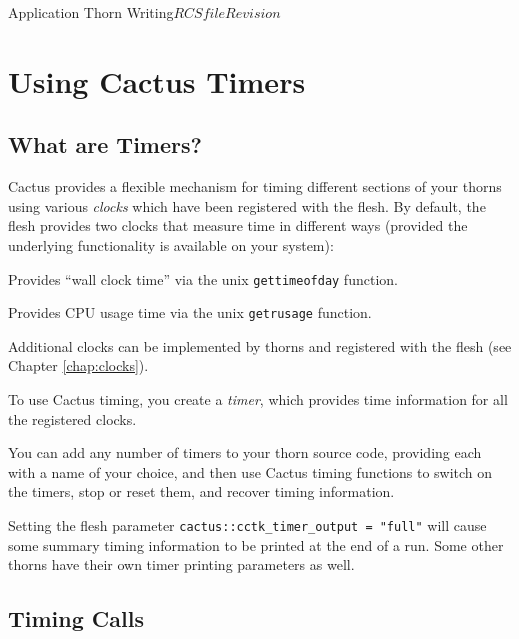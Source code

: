 \begin{cactuspart}{Application Thorn Writing}{$RCSfile$}{$Revision$}

\section{Using Cactus Timers}
\label{sec:timers}

\subsection{What are Timers?}

Cactus provides a flexible mechanism for timing different sections of your
thorns using various \textit{clocks} which have been registered with the flesh. 
By default, the flesh provides two clocks that measure time in different
ways (provided the underlying functionality is available on your system):

\begin{Lentry}

\item[\texttt{GetTimeOfDay}]
        Provides ``wall clock time'' via the unix \texttt{gettimeofday} function.
\item[\texttt{GetrUsage}]
        Provides CPU usage time via the unix \texttt{getrusage} function.
\end{Lentry}

Additional clocks can be implemented by thorns and registered with the
flesh (see Chapter \ref{chap:clocks}).

To use Cactus timing, you create a \textit{timer}, which provides time
information for all the registered clocks.

You can add any number of timers to your thorn source code, providing
each with a name of your choice, and then use Cactus timing functions to
switch on the timers, stop or reset them, and recover timing information.

Setting the flesh parameter \texttt{cactus::cctk\_timer\_output = "full"}
will cause some summary timing information to be printed at the end of a run. 
Some other thorns have their own timer printing parameters as well.

\subsection{Timing Calls}


\end{cactuspart}

